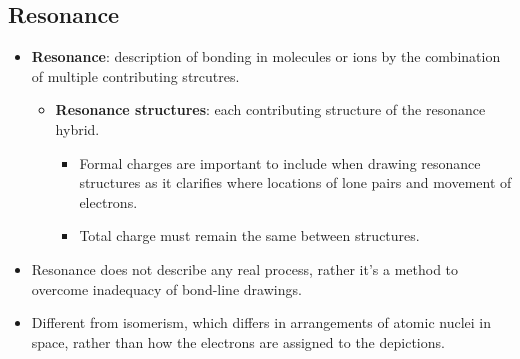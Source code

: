 \documentclass[12pt,a4paper]{article}
\begin{document}
\subsection{Resonance}
\begin{itemize}
    \item \textbf{Resonance}: description of bonding in molecules or ions by the combination of multiple contributing strcutres.
            \begin{itemize}
            \item \textbf{Resonance structures}: each contributing structure of the resonance hybrid.
                \begin{itemize}
                    \item Formal charges are important to include when drawing resonance structures as it clarifies where locations of lone pairs and movement of electrons.
                    \item Total charge must remain the same between structures.
                \end{itemize}
        \end{itemize}
    \item Resonance does not describe any real process, rather it's a method to overcome inadequacy of bond-line drawings.
    \item Different from isomerism, which differs in arrangements of atomic nuclei in space, rather than how the electrons are assigned to the depictions.

\end{itemize}
\end{document}
